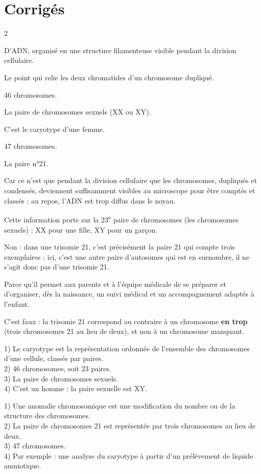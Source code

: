 \section{Corrigés}
\begin{multicols}{2}

D'ADN, organisé en une structure filamenteuse visible pendant la division cellulaire.

Le point qui relie les deux chromatides d'un chromosome dupliqué.

46 chromosomes.

La paire de chromosomes sexuels (XX ou XY).

C'est le caryotype d'une femme.

47 chromosomes.

La paire n°21.

Car ce n'est que pendant la division cellulaire que les chromosomes, dupliqués et
condensés, deviennent suffisamment visibles au microscope pour être comptés et
classés ; au repos, l'ADN est trop diffus dans le noyau.

Cette information porte sur la 23\textsuperscript{e} paire de chromosomes (les
chromosomes sexuels) : XX pour une fille, XY pour un garçon.

Non : dans une trisomie 21, c'est précisément la paire 21 qui compte trois
exemplaires ; ici, c'est une autre paire d'autosomes qui est en surnombre, il ne s'agit
donc pas d'une trisomie 21.

Parce qu'il permet aux parents et à l'équipe médicale de se préparer et d'organiser,
dès la naissance, un suivi médical et un accompagnement adaptés à l'enfant.

C'est faux : la trisomie 21 correspond au contraire à un chromosome \textbf{en trop}
(trois chromosomes 21 au lieu de deux), et non à un chromosome manquant.

1) Le caryotype est la représentation ordonnée de l'ensemble des chromosomes d'une
cellule, classés par paires.\\
2) 46 chromosomes, soit 23 paires.\\
3) La paire de chromosomes sexuels.\\
4) C'est un homme : la paire sexuelle est XY.

1) Une anomalie chromosomique est une modification du nombre ou de la structure des
chromosomes.\\
2) La paire de chromosomes 21 est représentée par trois chromosomes au lieu de deux.\\
3) 47 chromosomes.\\
4) Par exemple : une analyse du caryotype à partir d'un prélèvement de liquide
amniotique.

\end{multicols}
\exercicesBanner
